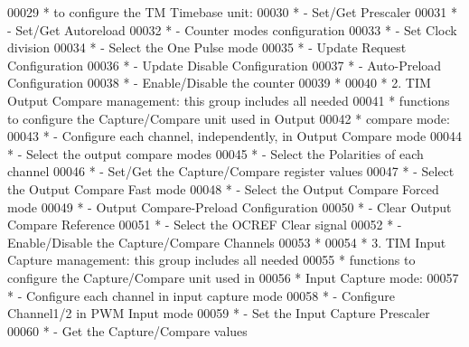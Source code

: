 \begin{DoxyCode}
00029 \textcolor{comment}{  *             to configure the TM Timebase unit:}
00030 \textcolor{comment}{  *                   - Set/Get Prescaler}
00031 \textcolor{comment}{  *                   - Set/Get Autoreload  }
00032 \textcolor{comment}{  *                   - Counter modes configuration}
00033 \textcolor{comment}{  *                   - Set Clock division  }
00034 \textcolor{comment}{  *                   - Select the One Pulse mode}
00035 \textcolor{comment}{  *                   - Update Request Configuration}
00036 \textcolor{comment}{  *                   - Update Disable Configuration}
00037 \textcolor{comment}{  *                   - Auto-Preload Configuration }
00038 \textcolor{comment}{  *                   - Enable/Disable the counter     }
00039 \textcolor{comment}{  *                 }
00040 \textcolor{comment}{  *          2. TIM Output Compare management: this group includes all needed }
00041 \textcolor{comment}{  *             functions to configure the Capture/Compare unit used in Output }
00042 \textcolor{comment}{  *             compare mode: }
00043 \textcolor{comment}{  *                   - Configure each channel, independently, in Output Compare mode}
00044 \textcolor{comment}{  *                   - Select the output compare modes}
00045 \textcolor{comment}{  *                   - Select the Polarities of each channel}
00046 \textcolor{comment}{  *                   - Set/Get the Capture/Compare register values}
00047 \textcolor{comment}{  *                   - Select the Output Compare Fast mode }
00048 \textcolor{comment}{  *                   - Select the Output Compare Forced mode  }
00049 \textcolor{comment}{  *                   - Output Compare-Preload Configuration }
00050 \textcolor{comment}{  *                   - Clear Output Compare Reference}
00051 \textcolor{comment}{  *                   - Select the OCREF Clear signal}
00052 \textcolor{comment}{  *                   - Enable/Disable the Capture/Compare Channels    }
00053 \textcolor{comment}{  *                   }
00054 \textcolor{comment}{  *          3. TIM Input Capture management: this group includes all needed }
00055 \textcolor{comment}{  *             functions to configure the Capture/Compare unit used in }
00056 \textcolor{comment}{  *             Input Capture mode:}
00057 \textcolor{comment}{  *                   - Configure each channel in input capture mode}
00058 \textcolor{comment}{  *                   - Configure Channel1/2 in PWM Input mode}
00059 \textcolor{comment}{  *                   - Set the Input Capture Prescaler}
00060 \textcolor{comment}{  *                   - Get the Capture/Compare values      }

\end{DoxyCode}
